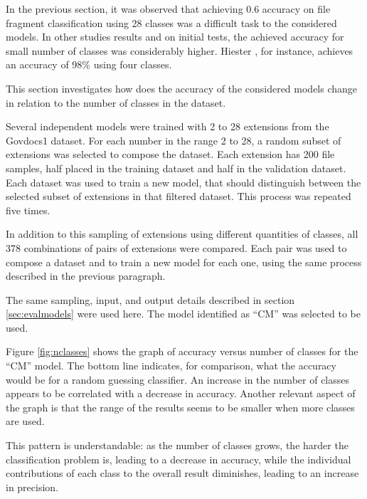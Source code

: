 \label{sec:numberofclasses}
In the previous section, it was observed that achieving 0.6 accuracy on file fragment classification using 28 classes was a difficult task to the considered models. In other studies results \cite{hiester_file_2018} \cite{sportiello_context-based_2012} \cite{amirani_feature-based_2013} \cite{maslim_distributed_2014} and on initial tests, the achieved accuracy for small number of classes was considerably higher. Hiester \cite{hiester_file_2018}, for instance, achieves an accuracy of 98\% using four classes.

This section investigates how does the accuracy of the considered models change in relation to the number of classes in the dataset.


Several independent models were trained with 2 to 28 extensions from the Govdocs1 dataset. For each number in the range 2 to 28, a random subset of extensions was selected to compose the dataset. Each extension has 200 file samples, half placed in the training dataset and half in the validation dataset. Each dataset was used to train a new model, that should distinguish between the selected subset of extensions in that filtered dataset. This process was repeated five times.



In addition to this sampling of extensions using different quantities of classes, all 378 combinations of pairs of extensions were compared. Each pair was used to compose a dataset and to train a new model for each one, using the same process described in the previous paragraph.

The same sampling, input, and output details described in section \ref{sec:evalmodels} were used here. The model identified as ``CM'' was selected to be used.

Figure \ref{fig:nclasses} shows the graph of accuracy versus number of classes for the ``CM'' model. The bottom line indicates, for comparison, what the accuracy would be for a random guessing classifier. An increase in the number of classes appears to be  correlated with a decrease in accuracy. Another relevant aspect of the graph is that the range of the results seems to be smaller when more classes are used.  

This pattern is understandable: as the number of classes grows, the harder the classification problem is, leading to a decrease in accuracy, while the individual contributions of each class to the overall result diminishes, leading to an increase in precision.


